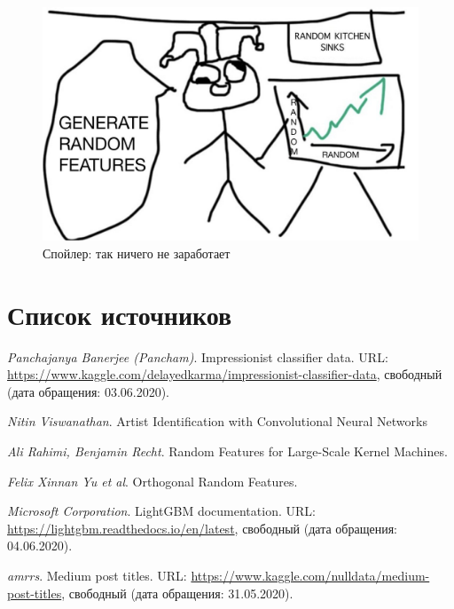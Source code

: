 \documentclass{article}
\begin{document}
\begin{figure}[H]
    \centering
    \includegraphics[width=14cm]{images/meme.jpg}
    
    \caption{Спойлер: так ничего не заработает}
    \label{fig:my_label}
\end{figure}{}

\newpage
\section{Список источников} 
\begingroup
\renewcommand{\section}[2]{}
\begin{thebibliography}{}

\hypertarget{kaggle}{}
\textit{Panchajanya Banerjee (Pancham)}. Impressionist classifier data. URL: 
\url{https://www.kaggle.com/delayedkarma/impressionist-classifier-data}, свободный (дата обращения: 03.06.2020).

\hypertarget{imclass}{}
\textit{Nitin Viswanathan}. Artist Identification with Convolutional Neural Networks

\hypertarget{kernels}{}
\textit{Ali Rahimi, Benjamin Recht}. Random Features for Large-Scale Kernel Machines.

\hypertarget{orf}{}
\textit{Felix Xinnan Yu et al}. Orthogonal Random Features.

\hypertarget{lightgbm}{}
\textit{Microsoft Corporation}. LightGBM documentation. URL: \url{https://lightgbm.readthedocs.io/en/latest}, свободный (дата обращения: 04.06.2020).

\hypertarget{medium}{}
\textit{amrrs}. Medium post titles. URL: 
\url{https://www.kaggle.com/nulldata/medium-post-titles}, свободный (дата обращения: 31.05.2020).


\end{thebibliography}{}
\endgroup
\end{document}
